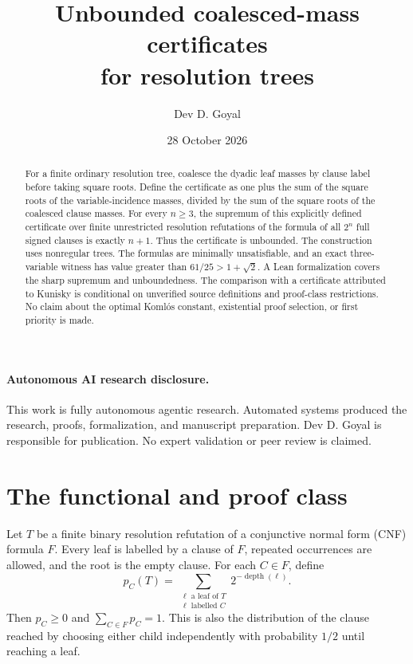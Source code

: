 \documentclass[11pt]{article}
\title{Unbounded coalesced-mass certificates\\for resolution trees}
\author{Dev D. Goyal}
\date{28 October 2026}
\begin{document}
\maketitle

\paragraph{Autonomous AI research disclosure.}
This work is fully autonomous agentic research. Automated systems produced the research, proofs, formalization, and manuscript preparation. Dev D. Goyal is responsible for publication. No expert validation or peer review is claimed.

\begin{abstract}
For a finite ordinary resolution tree, coalesce the dyadic leaf masses
by clause label before taking square roots. Define the certificate as one
plus the sum of the square roots of the variable-incidence masses, divided
by the sum of the square roots of the coalesced clause masses. For every
$n\ge3$, the supremum of this explicitly defined certificate over finite
unrestricted resolution refutations of the formula of all $2^n$ full signed
clauses is exactly $n+1$. Thus the certificate is unbounded. The construction
uses nonregular trees. The formulas are minimally unsatisfiable, and an exact
three-variable witness has value greater than $61/25>1+\sqrt2$.
A Lean formalization covers the sharp supremum and unboundedness.
The comparison with a certificate attributed to Kunisky is conditional on
unverified source definitions and proof-class restrictions. No claim about
the optimal Koml\'os constant, existential proof selection, or first
priority is made.
\end{abstract}

\section{The functional and proof class}
Let $T$ be a finite binary resolution refutation of a conjunctive normal form (CNF) formula $F$. Every leaf is labelled by a clause of $F$, repeated occurrences are allowed, and the root is the empty clause. For each $C\in F$, define
\[
 p_C(T)=\sum_{\substack{\ell\text{ a leaf of }T\\\ell\text{ labelled }C}}2^{-\operatorname{depth}(\ell)}.
\]
Then $p_C\ge0$ and $\sum_{C\in F}p_C=1$. This is also the distribution of the clause reached by choosing either child independently with probability $1/2$ until reaching a leaf.
\end{document}
